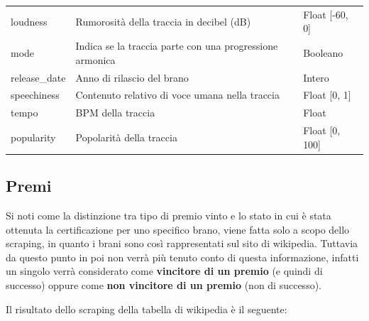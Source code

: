 \begin{center}
{\begin{tabular}[H]{ |l|l|l| }
			loudness & 
			Rumorosità della traccia in decibel (dB) &
			Float [-60, 0]\\
			
			mode & 
			Indica se la traccia parte con una progressione armonica &
			Booleano\\
			
			release\_date & 
			Anno di rilascio del brano&
			Intero\\
			
			speechiness & 
			Contenuto relativo di voce umana nella traccia &
			Float [0, 1]\\
			
			tempo & 
			BPM della traccia &
			Float\\
			
			popularity & 
			Popolarità della traccia &
			Float [0, 100]\\
			\hline
			
		\end{tabular}
	}
\end{center}



\subsection{Premi}
Si noti come la distinzione tra tipo di premio vinto e lo stato in cui è stata ottenuta la certificazione per uno specifico brano, viene fatta solo a scopo dello scraping, in quanto i brani sono così rappresentati sul sito di wikipedia. Tuttavia da questo punto in poi non verrà più tenuto conto di questa informazione, infatti un singolo verrà considerato come\textbf{ vincitore di un premio} (e quindi di successo) oppure come \textbf{non vincitore di un premio} (non di successo). 

Il risultato dello scraping della tabella di wikipedia è il seguente:


